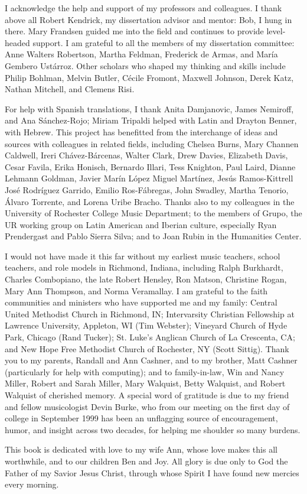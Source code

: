 I acknowledge the help and support of my professors and colleagues.
I thank above all Robert Kendrick, my dissertation advisor and mentor: 
Bob, I hung in there. 
Mary Frandsen guided me into the field and continues to provide level-headed
support.
I am grateful to all the members of my dissertation committee: Anne Walters
Robertson, Martha Feldman, Frederick de Armas, and María Gembero Ustárroz.
Other scholars who shaped my thinking and skills include 
Philip Bohlman,
Melvin Butler, 
Cécile Fromont, 
Maxwell Johnson, 
Derek Katz, 
Nathan Mitchell,
and 
Clemens Risi.

For help with Spanish translations, I thank Anita Damjanovic, James Nemiroff,
and Ana Sánchez-Rojo; Miriam Tripaldi helped with Latin and Drayton Benner,
with Hebrew.
This project has benefitted from the interchange of ideas and sources with
colleagues in related fields, including 
Chelsea Burns,
Mary Channen Caldwell,
Ireri Chávez-Bárcenas,
Walter Clark,
Drew Davies,
Elizabeth Davis,
Cesar Favila,
Erika Honisch,
Bernardo Illari,
Tess Knighton,
Paul Laird,
Dianne Lehmann Goldman,
Javier Marín López
Miguel Martínez, 
Jesús Ramos-Kittrell
José Rodríguez Garrido, 
Emilio Ros-Fábregas, 
John Swadley,
Martha Tenorio, 
Álvaro Torrente,
and 
Lorena Uribe Bracho.
Thanks also to my colleagues in the University of Rochester College Music
Department; to the members of Grupo, the UR working group on Latin American
and Iberian culture, especially Ryan Prendergast and Pablo Sierra
Silva; and to Joan Rubin in the Humanities Center.

I would not have made it this far without my earliest music teachers, school
teachers, and role models in Richmond, Indiana, including 
Ralph Burkhardt, 
Charles Combopiano, 
the late Robert Hensley, 
Ron Matson, 
Christine Rogan, 
Mary Ann Thompson,
and 
Norma Veramallay.
I am grateful to the faith communities and ministers who have supported me and
my family:
Central United Methodist Church in Richmond, IN; 
Intervarsity Christian Fellowship at Lawrence University, Appleton, WI (Tim
Webster); 
Vineyard Church of Hyde Park, Chicago (Rand Tucker); 
St. Luke's Anglican Church of La Crescenta, CA; 
and New Hope Free Methodist Church of Rochester, NY (Scott Sittig).
Thank you to my parents, Randall and Ann Cashner, and to
my brother, Matt Cashner (particularly for help with computing); and to
family-in-law, Win and Nancy Miller, Robert and Sarah Miller, Mary Walquist,
Betty Walquist, and Robert Walquist of cherished memory.
A special word of gratitude is due to my friend and fellow musicologist Devin
Burke, who from our meeting on the first day of college in September 1999 has
been an unflagging source of encouragement, humor, and insight across two
decades, for helping me shoulder so many burdens.

This book is dedicated with love to my wife Ann, whose love makes this all
worthwhile, and to our children Ben and Joy.
All glory is due only to God the Father of my Savior Jesus Christ, through
whose Spirit I have found new mercies every morning.

\endinput
